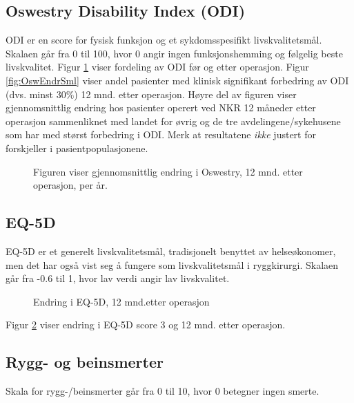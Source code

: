 \documentclass [norsk,a4paper,twoside]{article}\usepackage[]{graphicx}\usepackage[]{color}
\begin{document}
\subsection{Oswestry Disability Index (ODI)}
ODI er en score for fysisk funksjon og et sykdomsspesifikt livskvalitetsmål. Skalaen går fra 0
til 100, hvor 0 angir ingen funksjonshemming og følgelig beste livskvalitet.
Figur \ref{fig:OswEndr} viser fordeling av ODI før og etter operasjon.
Figur \ref{fig:OswEndrSml} viser andel pasienter med klinisk signifikant forbedring av ODI (dvs. minst 30$\%$) 12 mnd. etter operasjon. Høyre del av figuren viser gjennomsnittlig endring hos pasienter operert ved NKR 12 måneder
etter operasjon sammenliknet med landet for øvrig og de tre avdelingene/sykehusene som har 
med størst forbedring i ODI. Merk at resultatene \textit{ikke} justert for forskjeller i pasientpopulasjonene.




 

\begin{figure}[h] 
\centerline{
  }
  \caption{Figuren viser gjennomsnittlig endring i Oswestry, 12 mnd. etter operasjon, per år.}
  \label{fig:OswEndr}
\end{figure}


\subsection{EQ-5D}
EQ-5D er et generelt livskvalitetsmål, tradisjonelt benyttet av helseøkonomer, men det har også
vist seg å fungere som livskvalitetsmål i ryggkirurgi. Skalaen går fra -0.6 til 1, hvor lav verdi
angir lav livskvalitet.


\begin{figure}[h] 
\centerline{
  }
  \caption{Endring i EQ-5D, 12 mnd.etter operasjon}
  \label{fig:EQ5DEndr}
\end{figure}

Figur \ref{fig:EQ5DEndr} viser endring i EQ-5D score 3 og 12 mnd. etter operasjon. 


\subsection{Rygg- og beinsmerter}
Skala for rygg-/beinsmerter går fra 0 til 10, hvor 0 betegner ingen smerte.
\end{document}
